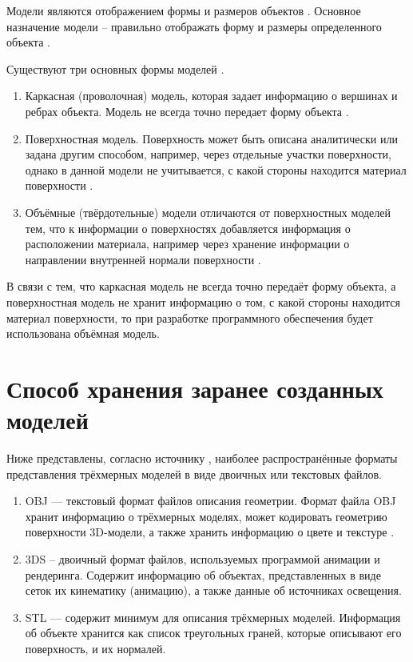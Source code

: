 Модели являются отображением формы и размеров объектов \cite{kurov:2023}. 
Основное назначение модели – правильно отображать форму и размеры определенного объекта \cite{kurov:2023}. 

Существуют три основных формы моделей \cite{kurov:2023}.

\begin{enumerate}
	\item Каркасная (проволочная) модель, которая задает информацию о вершинах и ребрах объекта. Модель не всегда точно передает форму объекта \cite{kurov:2023}.
	\item Поверхностная модель. Поверхность может быть описана аналитически или задана другим способом, например, через отдельные участки поверхности, однако в данной модели не учитывается, с какой стороны находится материал поверхности \cite{kurov:2023}.
	\item Объёмные (твёрдотельные) модели отличаются от поверхностных моделей тем, что к информации о поверхностях добавляется информация о расположении материала, например через хранение информации о направлении внутренней нормали поверхности \cite{kurov:2023}. 
\end{enumerate}

В связи с тем, что каркасная модель не всегда точно передаёт форму объекта, а поверхностная модель не хранит информацию о том, с какой стороны находится материал поверхности, то при разработке программного обеспечения будет использована объёмная модель.

\section{Способ хранения заранее созданных моделей}

Ниже представлены, согласно источнику \cite{formats}, наиболее распространённые форматы представления трёхмерных моделей в виде двоичных или текстовых файлов.

\begin{enumerate}
	\item OBJ — текстовый формат файлов описания геометрии. 
	Формат файла OBJ хранит информацию о трёхмерных моделях, может кодировать геометрию поверхности 3D-модели, а также хранить информацию о цвете и текстуре \cite{formats}.
	\item 3DS – двоичный формат файлов, используемых программой анимации и рендеринга.
	Содержит информацию об объектах, представленных в виде сеток их кинематику (анимацию), а также данные об источниках освещения.
	\item STL — содержит минимум для описания трёхмерных моделей. Информация об объекте хранится как список треугольных граней, которые описывают его поверхность, и их нормалей.
\end{enumerate}

